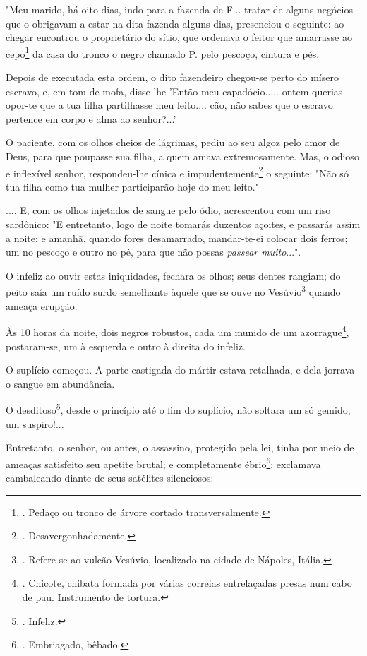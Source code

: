 "Meu marido, há oito dias, indo para a fazenda de F... tratar de alguns
negócios que o obrigavam a estar na dita fazenda alguns dias, presenciou
o seguinte: ao chegar encontrou o proprietário do sítio, que ordenava o
feitor que amarrasse ao cepo\footnote{. Pedaço ou tronco de árvore
  cortado transversalmente.} da casa do tronco o negro chamado P. pelo
pescoço, cintura e pés.

Depois de executada esta ordem, o dito fazendeiro chegou-se perto do
mísero escravo, e, em tom de mofa, disse-lhe 'Então meu capadócio.....
ontem querias opor-te que a tua filha partilhasse meu leito.... cão, não
sabes que o escravo pertence em corpo e alma ao senhor?...'

O paciente, com os olhos cheios de lágrimas, pediu ao seu algoz pelo
amor de Deus, para que poupasse sua filha, a quem amava extremosamente.
Mas, o odioso e inflexível senhor, respondeu-lhe cínica e
impudentemente\footnote{. Desavergonhadamente.} o seguinte: "Não só tua
filha como tua mulher participarão hoje do meu leito."

.... E, com os olhos injetados de sangue pelo ódio, acrescentou com um
riso sardônico: "E entretanto, logo de noite tomarás duzentos açoites, e
passarás assim a noite; e amanhã, quando fores desamarrado, mandar-te-ei
colocar dois ferros; um no pescoço e outro no pé, para que não possas
\emph{passear muito}...".

O infeliz ao ouvir estas iniquidades, fechara os olhos; seus dentes
rangiam; do peito saía um ruído surdo semelhante àquele que se ouve no
Vesúvio\footnote{. Refere-se ao vulcão Vesúvio, localizado na cidade de
  Nápoles, Itália.} quando ameaça erupção.

Às 10 horas da noite, dois negros robustos, cada um munido de um
azorrague\footnote{. Chicote, chibata formada por várias correias
  entrelaçadas presas num cabo de pau. Instrumento de tortura.},
postaram-se, um à esquerda e outro à direita do infeliz.

O suplício começou. A parte castigada do mártir estava retalhada, e dela
jorrava o sangue em abundância.

O desditoso\footnote{. Infeliz.}, desde o princípio até o fim do
suplício, não soltara um só gemido, um suspiro!...

Entretanto, o senhor, ou antes, o assassino, protegido pela lei, tinha
por meio de ameaças satisfeito seu apetite brutal; e completamente
ébrio\footnote{. Embriagado, bêbado.}; exclamava cambaleando diante de
seus satélites silenciosos:

